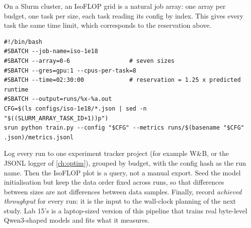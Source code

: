 On a Slurm cluster, an IsoFLOP grid is a natural job array: one array per budget, one task per
size, each task reading its config by index. This gives every task the same time limit, which
corresponds to the reservation above.

\begin{lstlisting}[style=shell, caption={One IsoFLOP budget as a Slurm job array (each task trains one size).},label={lst:scalinglaws:slurm}]
#!/bin/bash
#SBATCH --job-name=iso-1e18
#SBATCH --array=0-6                 # seven sizes
#SBATCH --gres=gpu:1 --cpus-per-task=8
#SBATCH --time=02:30:00             # reservation = 1.25 x predicted runtime
#SBATCH --output=runs/%x-%a.out
CFG=$(ls configs/iso-1e18/*.json | sed -n "$((SLURM_ARRAY_TASK_ID+1))p")
srun python train.py --config "$CFG" --metrics runs/$(basename "$CFG" .json)/metrics.jsonl
\end{lstlisting}

Log every run to one experiment tracker project (for example W\&B, or the JSONL logger of
\cref{ch:optim}), grouped by budget, with the config hash as the run name. Then the
IsoFLOP plot is a query, not a manual export. Seed the model initialisation but keep the data
order fixed across runs, so that differences between sizes are not differences between data
samples. Finally, record \emph{achieved throughput} for every run: it is the input to the
wall-clock planning of the next study. Lab 15's  is a laptop-sized version
of this pipeline that trains real byte-level Qwen3-shaped models and fits what it measures.

